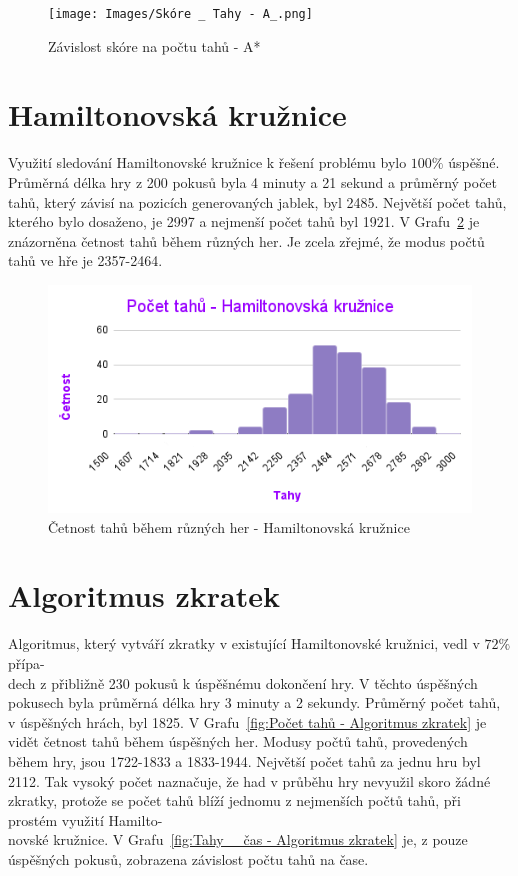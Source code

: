 \begin{figure}[H]
    \centering
    \texttt{[image: Images/Skóre \_ Tahy - A\_.png]}
    \caption{Závislost skóre na počtu tahů - A*}
    \label{fig:Skóre _ Tahy - A_}
\end{figure}

\section{Hamiltonovská kružnice}

Využití sledování Hamiltonovské kružnice k řešení problému bylo \(100\%\) úspěšné. Průměrná délka hry z 200 pokusů byla 4 minuty a 21 sekund a průměrný počet tahů, který závisí na pozicích generovaných jablek, byl 2485. Největší počet tahů, kterého bylo dosaženo, je 2997 a nejmenší počet tahů byl 1921. V Grafu~\ref{fig:Počet tahů - Hamiltonovská kružnice} je znázorněna četnost tahů během různých her. Je zcela zřejmé, že modus počtů tahů ve hře je 2357-2464.

\begin{figure}[H]
    \centering
    \includegraphics[width=\linewidth]{Images/Počet tahů - Hamiltonovská kružnice.png}
    \caption{Četnost tahů během různých her - Hamiltonovská kružnice}
    \label{fig:Počet tahů - Hamiltonovská kružnice}
\end{figure}

\section{Algoritmus zkratek}

Algoritmus, který vytváří zkratky v existující Hamiltonovské kružnici, vedl v \(72\%\) přípa-\\dech z přibližně 230 pokusů k úspěšnému dokončení hry. V těchto úspěšných pokusech byla průměrná délka hry 3 minuty a 2 sekundy. Průměrný počet tahů, v úspěšných hrách, byl 1825. V Grafu~\ref{fig:Počet tahů - Algoritmus zkratek} je vidět četnost tahů během úspěšných her. Modusy počtů tahů, provedených během hry, jsou 1722-1833 a 1833-1944. Největší počet tahů za jednu hru byl 2112. Tak vysoký počet naznačuje, že had v průběhu hry nevyužil skoro žádné zkratky, protože se počet tahů blíží jednomu z nejmenších počtů tahů, při prostém využití Hamilto-\\novské kružnice. V Grafu~\ref{fig:Tahy _ čas - Algoritmus zkratek} je, z pouze úspěšných pokusů, zobrazena závislost počtu tahů na čase.


